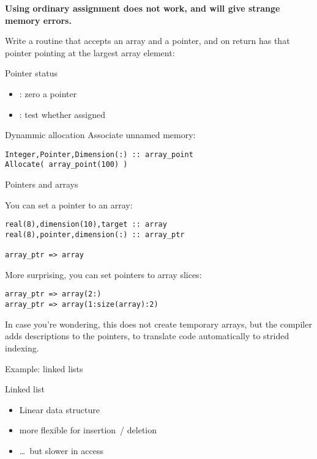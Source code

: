 \textbf{Using ordinary assignment does not work, and will give strange
  memory errors.}

\begin{exercise}
  \label{ex:fpoint-fun}
  Write a routine that accepts an array and a pointer, and on return
  has that pointer pointing at the largest array element:
\end{exercise}

\begin{block}{Pointer status}
  \label{sl:fpoint-stat}
  \begin{itemize}
  \item {}: zero a pointer
  \item {}: test whether assigned
  \end{itemize}  
\end{block}

\begin{block}{Dynammic allocation}
  \label{sl:fpoint-dynamic}
  Associate unnamed memory:
\begin{verbatim}
Integer,Pointer,Dimension(:) :: array_point
Allocate( array_point(100) )
\end{verbatim}  
\end{block}

 {Pointers and arrays}

You can set a pointer to an array:
\begin{verbatim}
real(8),dimension(10),target :: array
real(8),pointer,dimension(:) :: array_ptr

array_ptr => array
\end{verbatim}
More surprising, you can set pointers to array slices:
\begin{verbatim}
array_ptr => array(2:)
array_ptr => array(1:size(array):2)
\end{verbatim}

In case you're wondering, this does not create temporary arrays, but
the compiler adds descriptions to the pointers, to translate code
automatically to strided indexing.

 {Example: linked lists}

\begin{block}{Linked list}
  \label{sl:flink1}
  \begin{itemize}
  \item Linear data structure
  \item more flexible for insertion~/ deletion
  \item \ldots~but slower in access
  \end{itemize}
\end{block}

